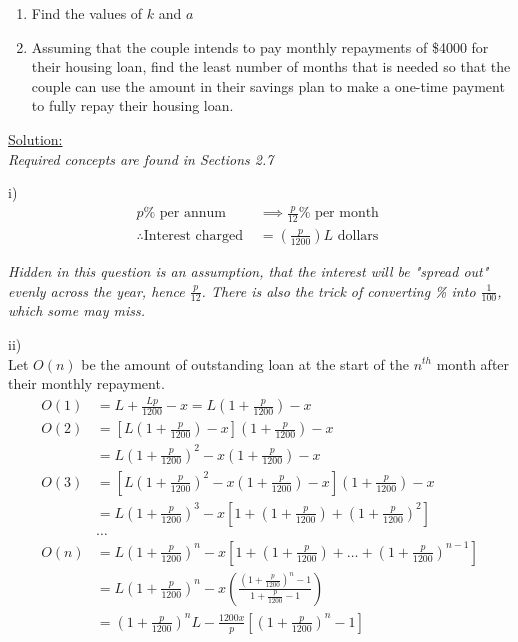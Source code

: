 \documentclass[12pt, a4paper, titlepage]{article}
\begin{document}
\begin{enumerate}[resume, label=(\roman*)]
    \item Find the values of $k$ and $a$
    \item Assuming that the couple intends to pay monthly repayments of \$4000 for their housing loan, find the least number of months that is needed so that the couple can use the amount in their savings plan to make a one-time payment to fully repay their housing loan.
\end{enumerate}

\begin{flushright}
\end{flushright}

\underline{Solution:} \\
\emph{Required concepts are found in Sections 2.7}

i)
\begin{align*}
    p\% \text{ per annum } &\implies \frac{p}{12}\% \text{ per month } \\
    \therefore \text{Interest charged } &= (\frac{p}{1200})L \text{ dollars}
\end{align*}

\emph{Hidden in this question is an assumption, that the interest will be "spread out" evenly across the year, hence $\frac{p}{12}$. There is also the trick of converting \% into $\frac{1}{100}$, which some may miss.}

ii) \\
Let $O(n)$ be the amount of outstanding loan at the start of the $n^{th}$ month after their monthly repayment.
\begin{align*}
    O(1) &= L + \frac{Lp}{1200} - x = L(1 + \frac{p}{1200}) - x \\
    O(2) &= [L(1 + \frac{p}{1200}) - x](1 + \frac{p}{1200}) - x \\
    &= L(1 + \frac{p}{1200})^2 - x(1 + \frac{p}{1200}) - x \\
    O(3) &= [L(1 + \frac{p}{1200})^2 - x(1 + \frac{p}{1200}) - x](1 + \frac{p}{1200}) - x \\
    &= L(1 + \frac{p}{1200})^3 - x[1 + (1 + \frac{p}{1200}) + (1 + \frac{p}{1200})^2] \\
    &\dots \\
    O(n) &= L(1 + \frac{p}{1200})^n - x[1 + (1 + \frac{p}{1200}) + \dots + (1 + \frac{p}{1200})^{n - 1}] \\
    &= L(1 + \frac{p}{1200})^n - x(\frac{(1 + \frac{p}{1200})^n - 1}{1 + \frac{p}{1200} - 1}) \\
    &= (1 + \frac{p}{1200})^nL - \frac{1200x}{p}[(1 + \frac{p}{1200})^n - 1]
\end{align*}
\end{document}
